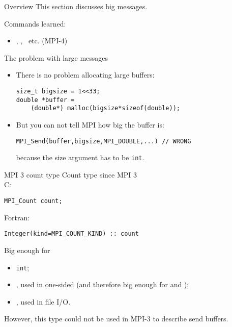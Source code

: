 
\begin{numberedframe}{Overview}
  This section discusses big messages.

  Commands learned:
  \begin{itemize}
  \item {}, ,
    ~etc. (MPI-4)
  \end{itemize}
\end{numberedframe}

\begin{numberedframe}{The problem with large messages}
  \begin{itemize}
  \item There is no problem allocating large buffers:
\begin{lstlisting}
size_t bigsize = 1<<33;
double *buffer =
    (double*) malloc(bigsize*sizeof(double));
\end{lstlisting}
\item But you can not tell MPI how big the buffer is:
\begin{lstlisting}
MPI_Send(buffer,bigsize,MPI_DOUBLE,...) // WRONG
\end{lstlisting}
because the size argument has to be \lstinline{int}.
  \end{itemize}
\end{numberedframe}

\begin{numberedframe}{MPI 3 count type}
  Count type since MPI 3\\
  C:
\begin{lstlisting}
MPI_Count count;
\end{lstlisting}
Fortran:
\lstset{language=Fortran}
\begin{lstlisting}
Integer(kind=MPI_COUNT_KIND) :: count
\end{lstlisting}
\lstset{language=C}
Big enough for
\begin{itemize}
\item
  \lstinline{int};
\item {}, used in one-sided
  (and therefore big enough for  and );
\item {}, used in file I/O.
\end{itemize}
However, this type could not be used in MPI-3 to describe send buffers.
\end{numberedframe}


